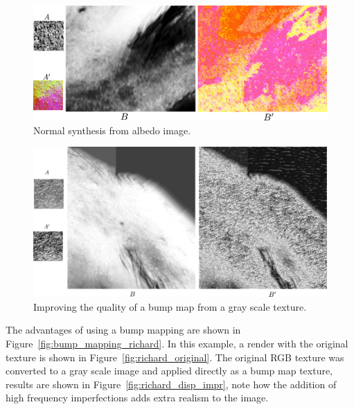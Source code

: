 \begin{figure}[htbp!]
\centering
\includegraphics[width=\textwidth]{img/normal_generation}
	\caption{ Normal synthesis from albedo image.}
	\label{fig:normal_synthesis}
\end{figure}

\begin{figure}[htbp!]
\centering
\includegraphics[width=\textwidth]{img/bump_map_quality_increase}
	\caption{ Improving the quality of a bump map from a gray scale texture.}
	\label{fig:bump_map_quality_increase}
\end{figure}

The advantages of using a bump mapping are shown in Figure~\ref{fig:bump_mapping_richard}.
In this example, a render with the original texture is shown in Figure~\ref{fig:richard_original}.
The original RGB texture was converted to a gray scale image and applied directly as a bump map texture,
results are shown in Figure~\ref{fig:richard_disp_impr}, note how the addition of high frequency imperfections adds extra realism to the image.

